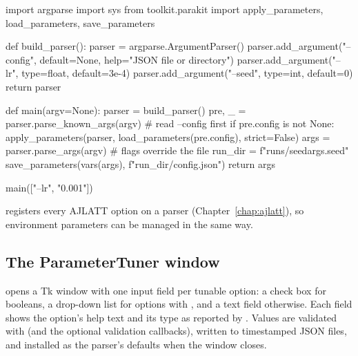 \begin{pycode}
import argparse
import sys
from toolkit.parakit import apply_parameters, load_parameters, save_parameters

def build_parser():
    parser = argparse.ArgumentParser()
    parser.add_argument("--config", default=None, help="JSON file or directory")
    parser.add_argument("--lr", type=float, default=3e-4)
    parser.add_argument("--seed", type=int, default=0)
    return parser

def main(argv=None):
    parser = build_parser()
    pre, _ = parser.parse_known_args(argv)          # read --config first
    if pre.config is not None:
        apply_parameters(parser, load_parameters(pre.config), strict=False)
    args = parser.parse_args(argv)                  # flags override the file
    run_dir = f"runs/seed{args.seed}"
    save_parameters(vars(args), f"{run_dir}/config.json")
    return args

main(["--lr", "0.001"])
\end{pycode}

 registers every AJLATT option on a
parser (Chapter~\ref{chap:ajlatt}), so environment parameters can be managed
in the same way.

\subsection{The ParameterTuner window}\label{sec:parakit-gui}

 opens a Tk window with one input field per tunable
option: a check box for booleans, a drop-down list for options with
, and a text field otherwise. Each field shows the option's help
text and its type as reported by . Values are validated
with  (and the optional validation callbacks), written to
timestamped JSON files, and installed as the parser's defaults when the window
closes.

